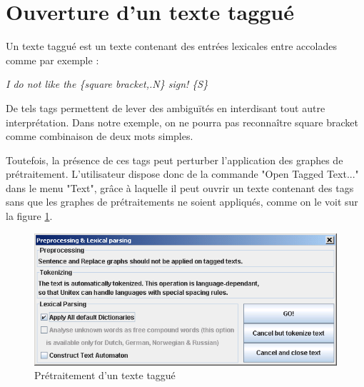 \section{Ouverture d’un texte taggué}
Un texte taggué est un texte contenant des entrées lexicales entre accolades comme par
exemple :


\bigskip
\textit{I do not like the \{square bracket,.N\} sign! \{S\}}

\bigskip
\noindent De tels tags permettent de lever des ambiguïtés en interdisant tout autre interprétation.
Dans notre exemple, on ne pourra pas reconnaître square bracket comme combinaison de deux mots
simples.


\bigskip
\noindent Toutefois, la présence de ces tags peut perturber l’application des graphes de
prétraitement. L’utilisateur dispose donc de la commande "Open Tagged Text..." dans le menu "Text",
grâce à laquelle il peut ouvrir un texte contenant des tags sans que les graphes de prétraitements
ne soient appliqués, comme on le voit sur la figure \ref{preprocess-tagged-text}.

\bigskip
\begin{figure}[!h]
\begin{center}
\includegraphics[width=14cm]{resources/img/fig2-15.png}
\caption{Prétraitement d’un texte taggué\label{preprocess-tagged-text}}
\end{center}
\end{figure}

